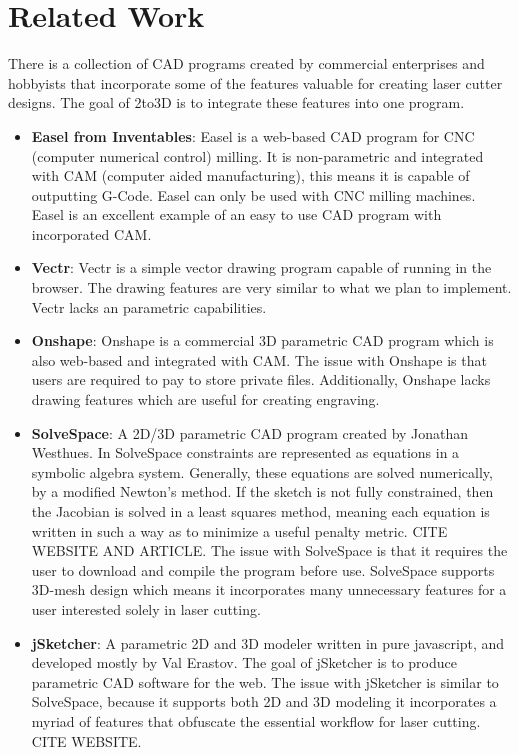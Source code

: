 
\section{Related Work}


There is a collection of CAD programs created by commercial enterprises and hobbyists that incorporate some of the features valuable for creating laser cutter designs. The goal of 2to3D is to integrate these features into one program.

\begin{itemize}
  \item \textbf{Easel from Inventables}: Easel is a web-based CAD program for CNC (computer numerical control) milling. It is non-parametric and integrated with CAM (computer aided manufacturing), this means it is capable of outputting G-Code. Easel can only be used with CNC milling machines. Easel is an excellent example of an easy to use CAD program with incorporated CAM.
  \item \textbf{Vectr}: Vectr is a simple vector drawing program capable of running in the browser. The drawing features are very similar to what we plan to implement. Vectr lacks an parametric capabilities.
  \item \textbf{Onshape}: Onshape is a commercial 3D parametric CAD program which is also web-based and integrated with CAM. The issue with Onshape is that users are required to pay to store private files. Additionally, Onshape lacks drawing features which are useful for creating engraving.
  \item \textbf{SolveSpace}: A 2D/3D parametric CAD program created by Jonathan Westhues. In SolveSpace constraints are represented as equations in a symbolic algebra system. Generally, these equations are solved numerically, by a modified Newton's method. If the sketch is not fully constrained, then the Jacobian is solved in a least squares method, meaning each equation is written in such a way as to minimize a useful penalty metric. CITE WEBSITE AND ARTICLE. The issue with SolveSpace is that it requires the user to download and compile the program before use. SolveSpace supports 3D-mesh design which means it incorporates many unnecessary features for a user interested solely in laser cutting.
  \item \textbf{jSketcher}: A parametric 2D and 3D modeler written in pure javascript, and developed mostly by Val Erastov. The goal of jSketcher is to produce parametric CAD software for the web. The issue with jSketcher is similar to SolveSpace, because it supports both 2D and 3D modeling it incorporates a myriad of features that obfuscate the essential workflow for laser cutting. CITE WEBSITE.
\end{itemize}
